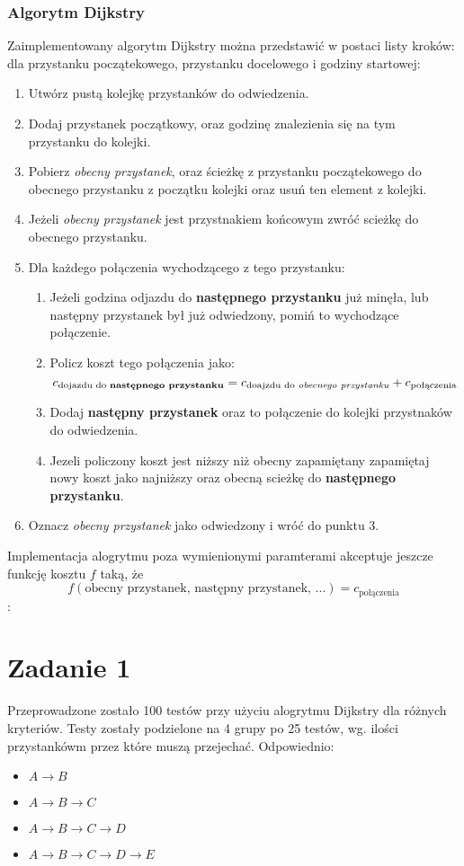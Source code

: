 \documentclass[12pt,a4paper]{article}
\begin{document}
    \subsubsection*{Algorytm Dijkstry}
    \noindent
    Zaimplementowany algorytm Dijkstry można przedstawić w postaci listy kroków:
    dla przystanku początekowego, przystanku docelowego i godziny startowej:
    \begin{enumerate}
        \item Utwórz pustą kolejkę przystanków do odwiedzenia.
        \item Dodaj przystanek początkowy, oraz godzinę znalezienia się na tym przystanku do kolejki.
        \item Pobierz \emph{obecny przystanek}, oraz ścieżkę z przystanku początekowego do obecnego przystanku z początku kolejki oraz usuń ten element z kolejki.
        \item Jeżeli \emph{obecny przystanek} jest przystnakiem końcowym zwróć scieżkę do obecnego przystanku.
        \item Dla każdego połączenia wychodzącego z tego przystanku: \begin{enumerate}
            \item Jeżeli godzina odjazdu do \textbf{następnego przystanku} już minęła, lub następny przystanek był już odwiedzony, pomiń to wychodzące połączenie.
            \item Policz koszt tego połączenia jako: $$c_{\text{dojazdu do \textbf{następnego przystanku}}} = c_{\text{doajzdu do \emph{obecnego przystanku}}} + c_{\text{połączenia}}$$
            \item Dodaj \textbf{następny przystanek} oraz to połączenie do kolejki przystnaków do odwiedzenia.
            \item Jezeli policzony koszt jest niższy niż obecny zapamiętany zapamiętaj nowy koszt jako najniższy oraz obecną scieżkę do \textbf{następnego przystanku}.
        \end{enumerate}
        \item Oznacz \emph{obecny przystanek} jako odwiedzony i wróć do punktu 3.
    \end{enumerate}
    Implementacja alogrytmu poza wymienionymi paramterami akceptuje jeszcze funkcję kosztu $f$ taką, że $$f(\text{obecny przystanek, następny przystanek, ...}) = c_{\text{połączenia}}$$:
    \section*{Zadanie 1}
    Przeprowadzone zostało 100 testów przy użyciu alogrytmu Dijkstry dla różnych kryteriów. Testy zostały podzielone na 4 grupy po 25 testów, wg. ilości przystankówm przez które muszą przejechać. Odpowiednio:
    \begin{itemize}
        \item $A \rightarrow B$
        \item $A \rightarrow B \rightarrow C$
        \item $A \rightarrow B \rightarrow C \rightarrow D$
        \item $A \rightarrow B \rightarrow C \rightarrow D \rightarrow E$
    \end{itemize}
\end{document}
